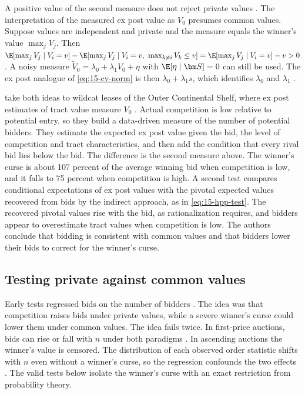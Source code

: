 A positive value of the second measure does not reject private values
\citep[footnote~86]{AtheyHaile2007}. The interpretation of the measured ex post value as $V_0$ presumes common
values. Suppose values are independent and private and the measure equals the winner's value $\max_jV_j$. Then
$\E[\max_jV_j\mid V_i=v]-\E[\max_jV_j\mid V_i=v,\ \max_{k\ne i}V_k\le v]=\E[\max_jV_j\mid V_i=v]-v>0$. A noisy
measure $\tilde V_0=\lambda_0+\lambda_1V_0+\eta$ with $\E[\eta\mid\bm S]=0$ can still be used. The ex post
analogue of \eqref{eq:15-cv-norm} is then $\lambda_0+\lambda_1s$, which identifies $\lambda_0$ and $\lambda_1$
\citep[eq.~(7.11)]{AtheyHaile2007}.

\citet{HendricksPinksePorter2003} take both ideas to wildcat leases of the Outer Continental Shelf, where ex
post estimates of tract value measure $V_0$ \citep[p.~126]{HortacsuPerrigne2021}. Actual competition is low
relative to potential entry, so they build a data-driven measure of the number of potential bidders. They
estimate the expected ex post value given the bid, the level of competition and tract characteristics, and
then add the condition that every rival bid lies below the bid. The difference is the second measure above.
The winner's curse is about 107 percent of the average winning bid when competition is low, and it falls to
75 percent when competition is high. A second test compares conditional expectations of ex post values with
the pivotal expected values recovered from bids by the indirect approach, as in \eqref{eq:15-hpp-test}. The
recovered pivotal values rise with the bid, as rationalization requires, and bidders appear to overestimate
tract values when competition is low. The authors conclude that bidding is consistent with common values
and that bidders lower their bids to correct for the winner's curse.

\subsection{Testing private against common values}\label{sec:15-cv-tests}

Early tests regressed bids on the number of bidders \citep{GilleyKarels1981,Paarsch1992}. The idea was that
competition raises bids under private values, while a severe winner's curse could lower them under common
values. The idea fails twice. In first-price auctions, bids can rise or fall with $n$ under both paradigms
\citep{PinkseTan2005}. In ascending auctions the winner's value is censored. The distribution of each observed
order statistic shifts with $n$ even without a winner's curse, so the regression confounds the two effects
\citep[Section~8]{AtheyHaile2007}. The valid tests below isolate the winner's curse with an exact restriction
from probability theory.

